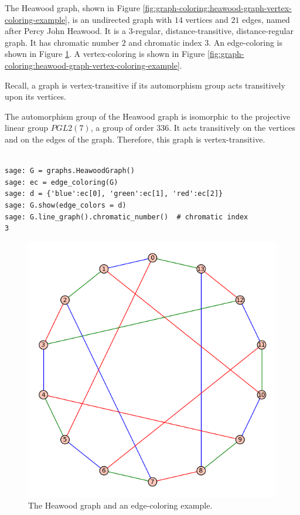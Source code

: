 \begin{example}
\label{example:graph-coloring:heawood-graph-example}
The Heawood graph, shown in Figure
\ref{fig:graph-coloring:heawood-graph-vertex-coloring-example},
is an undirected graph with $14$ vertices and $21$ edges, named after
Percy John Heawood.
It is a $3$-regular, distance-transitive, distance-regular graph.
It has chromatic number $2$ and chromatic index $3$.
An edge-coloring is shown in Figure
\ref{fig:graph-coloring:heawood-graph-edge-coloring-example}.
A vertex-coloring is shown in Figure
\ref{fig:graph-coloring:heawood-graph-vertex-coloring-example}.

Recall, a graph is vertex-transitive if its automorphism 
group acts transitively upon its vertices. 

The automorphism group of the Heawood graph is isomorphic to the
projective linear group $PGL2(7)$, a group of order $336$. It acts
transitively on the vertices and on the edges of the
graph. Therefore, this graph is vertex-transitive.

\begin{verbatim}

sage: G = graphs.HeawoodGraph()
sage: ec = edge_coloring(G)
sage: d = {'blue':ec[0], 'green':ec[1], 'red':ec[2]}
sage: G.show(edge_colors = d)
sage: G.line_graph().chromatic_number()  # chromatic index
3

\end{verbatim}


\begin{figure}[!htbp]
\centering
\includegraphics[scale=0.7]{image/graph-coloring/heawood-graph-edge-coloring-example}
\caption{The Heawood graph and an edge-coloring example.}
\label{fig:graph-coloring:heawood-graph-edge-coloring-example}
\end{figure}



\end{example}
